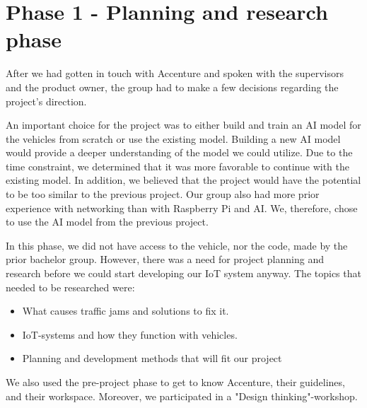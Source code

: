 \section{Phase 1 - Planning and research phase}\label{sec:phase1}

After we had gotten in touch with Accenture and spoken with the supervisors and the product owner, the group had to make a few decisions regarding the project's direction.

An important choice for the project was to either build and train an AI model for the vehicles from scratch or use the existing model. Building a new AI model would provide a deeper understanding of the model we could utilize. Due to the time constraint, we determined that it was more favorable to continue with the existing model. In addition, we believed that the project would have the potential to be too similar to the previous project.  Our group also had more prior experience with networking than with Raspberry Pi and AI. We, therefore, chose to use the AI model from the previous project. 

In this phase, we did not have access to the vehicle, nor the code, made by the prior bachelor group. However, there was a need for project planning and research before we could start developing our IoT system anyway. The topics that needed to be researched were:

\begin{itemize}
\item What causes traffic jams and solutions to fix it.
\item IoT-systems and how they function with vehicles.
\item Planning and development methods that will fit our project
\end{itemize}

We also used the pre-project phase to get to know Accenture, their guidelines, and their workspace. Moreover, we participated in a "Design thinking"-workshop. 









\clearpage